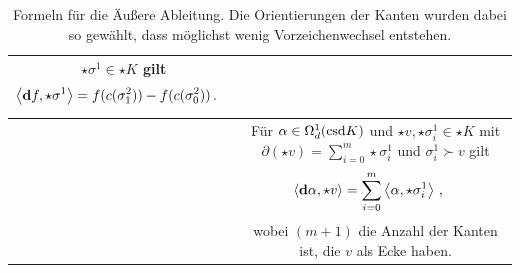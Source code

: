 \begin{bemerkung}
\begin{table}[htbp]
\begin{tabular}{|c|c|}
\begin{minipage}[c]{0.69\textwidth}
        \( \star\sigma^{1} \in \star K \) gilt
        {\begin{align}
          \left\langle \mathbf{d} f , \star\sigma^{1} \right\rangle &= f(c(\sigma^{2}_{1})) - f(c(\sigma^{2}_{0})) \,\text{.}
        \end{align}}
      \end{minipage} \\\hline
      \begin{minipage}[c]{0.30\textwidth}
        \centering
      \end{minipage} &
      \begin{minipage}[c]{0.68\textwidth}
        Für \( \alpha\in\Omega_{d}^{1}(\text{csd} K) \) und \( \star v, \star\sigma_{i}^{1} \in \star K \) mit
        \( \partial(\star v) = \sum_{i=0}^{m} \star\sigma_{i}^{1} \) und \( \sigma_{i}^{1} \succ v  \) gilt
        {\begin{align}
          \left\langle \mathbf{d} \alpha , \star v \right\rangle &=  \sum_{i=0}^{m} \left\langle \alpha, \star\sigma_{i}^{1}\right\rangle
          \,\text{,}
        \end{align}}
        wobei \( (m+1) \) die Anzahl der Kanten ist, die \( v \) als Ecke haben.
      \end{minipage} \\\hline
    \end{tabular}
    \caption[Formeln für Äußere Ableitung]{Formeln für die Äußere Ableitung. 
                  Die Orientierungen der Kanten wurden dabei so gewählt, dass möglichst wenig Vorzeichenwechsel entstehen.}
    \label{tabFormelAbleitung}
    \end{table}
  \end{bemerkung}

